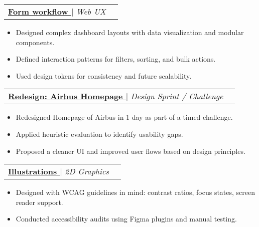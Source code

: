 \documentclass[letterpaper,11pt]{article}
\makeatletter
\newcommand{\resumeItem}[1]{
  \item\small{
    {#1 \vspace{-2pt}}
  }
}
\newcommand{\resumeProjectHeading}[2]{
    \item
    \begin{tabular*}{0.97\textwidth}{l@{\extracolsep{\fill}}r}
      \small#1 & #2 \\
    \end{tabular*}\vspace{-7pt}
}
\newcommand{\resumeItemListStart}{\begin{itemize}}
\newcommand{\resumeItemListEnd}{\end{itemize}\vspace{-5pt}}
\makeatother
\begin{document}

\resumeProjectHeading
{\textbf{\href{https://www.figma.com/proto/FDzLI8iFLeLZlHILiegUCq/Form-Flow?node-id=319-2\&p=f\&t=P8sbfSEUZwxSHvC4-1\&scaling=min-zoom\&content-scaling=fixed\&page-id=120\%3A1572\&starting-point-node-id=319\%3A2\&show-proto-sidebar=1
}{\underline{Form workflow \faExternalLink}}} $|$ \footnotesize\emph{Web UX}}{}
\resumeItemListStart
  \resumeItem{Designed complex dashboard layouts with data visualization and modular components.}
  \resumeItem{Defined interaction patterns for filters, sorting, and bulk actions.}
  \resumeItem{Used design tokens for consistency and future scalability.}
\resumeItemListEnd

\resumeProjectHeading
{\textbf{\href{https://drive.google.com/drive/folders/1CMzkaQtdAxG8_-2rk0KZN3E4mP4Y_rw2?usp=sharing}{\underline{Redesign: Airbus Homepage \faExternalLink}}} $|$ \footnotesize\emph{Design Sprint / Challenge}}{}
\resumeItemListStart
  \resumeItem{Redesigned Homepage of Airbus in 1 day as part of a timed challenge.}
  \resumeItem{Applied heuristic evaluation to identify usability gaps.}
  \resumeItem{Proposed a cleaner UI and improved user flows based on design principles.}
\resumeItemListEnd

\resumeProjectHeading
{\textbf{\href{https://www.figma.com/proto/BelhPoJn2rRVsZTz3HmEMh/Illustrations?node-id=212-339\&t=z6rr6oZyUT8w9rMV-1
}{\underline{Illustrations \faExternalLink}}} $|$ \footnotesize\emph{2D Graphics}}{}
\resumeItemListStart
  \resumeItem{Designed with WCAG guidelines in mind: contrast ratios, focus states, screen reader support.}
  \resumeItem{Conducted accessibility audits using Figma plugins and manual testing.}
\resumeItemListEnd

\end{document}
